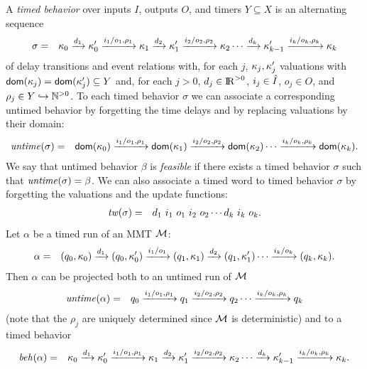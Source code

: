 A \emph{timed behavior} over inputs $I$, outputs $O$, and timers $Y \subseteq X$ is an alternating sequence
\begin{eqnarray}
\label{timedbehavior}
\sigma & = & \kappa_0 \xrightarrow{d_1} \kappa'_0 \xrightarrow{i_1/o_1, \rho_1} \kappa_1 \xrightarrow{d_2} \kappa'_1 \xrightarrow{i_2/o_2, \rho_2} \kappa_2 \cdots
\xrightarrow{d_k} \kappa'_{k-1} \xrightarrow{i_k/o_k, \rho_k} \kappa_{k}
\end{eqnarray}
of delay transitions and event relations with, for each $j$,
$\kappa_j, \kappa'_j$ valuations
with ${\textsf{dom}}(\kappa_j) = {\textsf{dom}}(\kappa'_j) \subseteq Y$ and,
for each $j>0$,  $d_j \in {\rm I\!R}^{> 0}$, $i_j \in \hat{I}$, $o_j \in O$, and $\rho_j \in Y \hookrightarrow {\mathbb N}^{>0}$.
To each timed behavior $\sigma$ we can associate a corresponding untimed behavior by forgetting the time
delays and by replacing valuations by their domain:
\begin{eqnarray*}
\mathit{untime}(\sigma) & = & {\textsf{dom}}(\kappa_0) \xrightarrow{i_1/o_1, \rho_1} {\textsf{dom}}(\kappa_1)  \xrightarrow{i_2/o_2, \rho_2} {\textsf{dom}}(\kappa_2) \cdots \xrightarrow{i_k/o_k, \rho_k} {\textsf{dom}}(\kappa_k).
\end{eqnarray*}
We say that untimed behavior $\beta$ is \emph{feasible} if there exists a timed behavior $\sigma$ such that $\mathit{untime}(\sigma) = \beta$.
We can also associate a timed word to timed behavior $\sigma$ by forgetting the valuations and the update functions:
\begin{eqnarray*}
\mathit{tw}(\sigma) & = & d_ 1 ~ i_1 ~ o_1 ~ i_2 ~ o_2 \cdots d_k ~ i_k ~ o_k.
\end{eqnarray*} 
Let $\alpha$ be a timed run of an MMT ${\cal M}$: 
\begin{eqnarray*}
\alpha & = & (q_0, \kappa_0) \xrightarrow{d_1} (q_0, \kappa'_0) \xrightarrow{i_1/o_1} (q_1, \kappa_1) \xrightarrow{d_2} (q_1, \kappa'_1)  \cdots
 \xrightarrow{i_k/o_k} (q_k, \kappa_k).
\end{eqnarray*}
Then $\alpha$ can be projected both to an untimed run of ${\cal M}$
\begin{eqnarray*}
\mathit{untime} (\alpha) & = & q_0 \xrightarrow{i_1/o_1, \rho_1} q_1  \xrightarrow{i_2/o_2, \rho_2} q_2 \cdots \xrightarrow{i_k/o_k, \rho_k} q_k
\end{eqnarray*}
(note that the $\rho_j$ are uniquely determined since ${\cal M}$ is deterministic) and to a timed behavior
\begin{eqnarray*}
\mathit{beh}(\alpha) & = & \kappa_0 \xrightarrow{d_1} \kappa'_0 \xrightarrow{i_1/o_1, \rho_1} \kappa_1 \xrightarrow{d_2} \kappa'_1 \xrightarrow{i_2/o_2, \rho_2} \kappa_2 \cdots
\xrightarrow{d_k} \kappa'_{k-1} \xrightarrow{i_k/o_k, \rho_k} \kappa_{k}.
\end{eqnarray*}
